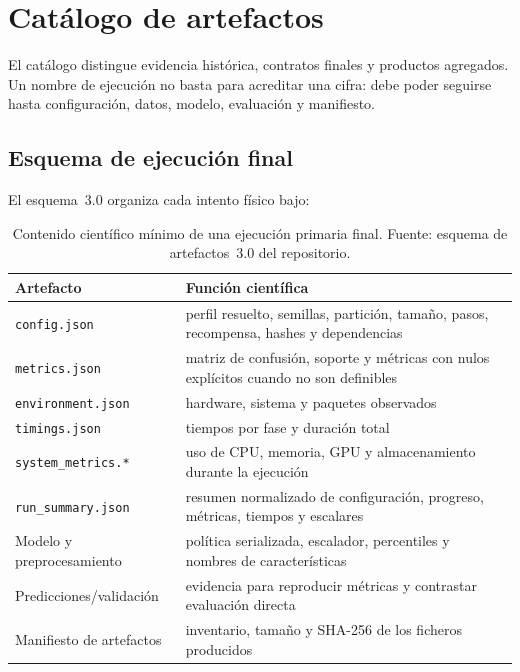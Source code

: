 \chapter{Catálogo de artefactos}
\label{cap:anexo-artefactos}

El catálogo distingue evidencia histórica, contratos finales y productos agregados. Un nombre de ejecución no basta para acreditar una cifra: debe poder seguirse hasta configuración, datos, modelo, evaluación y manifiesto.

\section{Esquema de ejecución final}

El esquema~3.0 organiza cada intento físico bajo:

\begin{center}
\end{center}

\begin{table}[htbp]
\centering
\footnotesize
\begin{tabular}{p{3.7cm}p{8.3cm}}
\toprule
Artefacto & Función científica \\
\midrule
\texttt{config.json} & perfil resuelto, semillas, partición, tamaño, pasos, recompensa, hashes y dependencias \\
\texttt{metrics.json} & matriz de confusión, soporte y métricas con nulos explícitos cuando no son definibles \\
\texttt{environment.json} & hardware, sistema y paquetes observados \\
\texttt{timings.json} & tiempos por fase y duración total \\
\texttt{system\_metrics.*} & uso de CPU, memoria, GPU y almacenamiento durante la ejecución \\
\texttt{run\_summary.json} & resumen normalizado de configuración, progreso, métricas, tiempos y escalares \\
Modelo y preprocesamiento & política serializada, escalador, percentiles y nombres de características \\
Predicciones/validación & evidencia para reproducir métricas y contrastar evaluación directa \\
Manifiesto de artefactos & inventario, tamaño y SHA-256 de los ficheros producidos \\
\bottomrule
\end{tabular}
\caption[Contrato de artefactos por ejecución]{Contenido científico mínimo de una ejecución primaria final. Fuente: esquema de artefactos~3.0 del repositorio.}
\label{tab:contrato-artefactos-final}
\end{table}


